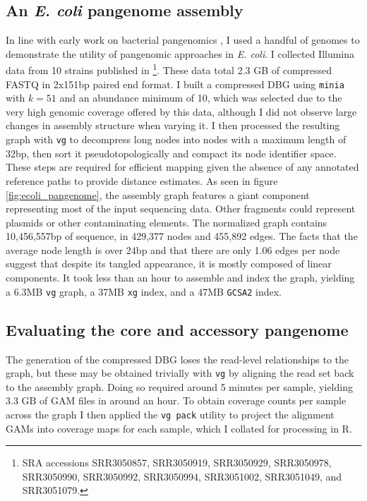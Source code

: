 \documentclass[a4paper,12pt,numbered,oneside]{Classes/PhDThesisPSnPDF}
\begin{document}
\subsection{An \emph{E. coli} pangenome assembly}

In line with early work on bacterial pangenomics \cite{medini2005microbial}, I used a handful of genomes to demonstrate the utility of pangenomic approaches in \emph{E. coli}.
I collected Illumina data from 10 strains published in \cite{earle2016identifying}\footnote{SRA accessions SRR3050857, SRR3050919, SRR3050929, SRR3050978, SRR3050990, SRR3050992, SRR3050994, SRR3051002, SRR3051049, and SRR3051079.}.
These data total 2.3 GB of compressed FASTQ in 2x151bp paired end format.
I built a compressed DBG using {\tt minia} with $k=51$ and an abundance minimum of 10, which was selected due to the very high genomic coverage offered by this data, although I did not observe large changes in assembly structure when varying it.
I then processed the resulting graph with {\tt vg} to decompress long nodes into nodes with a maximum length of 32bp, then sort it pseudotopologically and compact its node identifier space.
These steps are required for efficient mapping given the absence of any annotated reference paths to provide distance estimates.
As seen in figure \ref{fig:ecoli_pangenome}, the assembly graph features a giant component representing most of the input sequencing data.
Other fragments could represent plasmids or other contaminating elements.
The normalized graph contains 10,456,557bp of sequence, in 429,377 nodes and 455,892 edges.
The facts that the average node length is over 24bp and that there are only 1.06 edges per node suggest that despite its tangled appearance, it is mostly composed of linear components.
It took less than an hour to assemble and index the graph, yielding a 6.3MB {\tt vg} graph, a 37MB {\tt xg} index, and a 47MB {\tt GCSA2} index.

\subsection{Evaluating the core and accessory pangenome}

The generation of the compressed DBG loses the read-level relationships to the graph, but these may be obtained trivially with {\tt vg} by aligning the read set back to the assembly graph.
Doing so required around 5 minutes per sample, yielding 3.3 GB of GAM files in around an hour.
To obtain coverage counts per sample across the graph I then applied the {\tt vg pack} utility to project the alignment GAMs into coverage maps for each sample, which I collated for processing in R.
\end{document}
